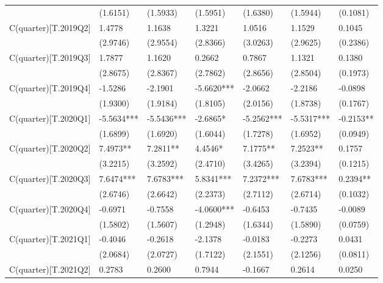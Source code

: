 \begin{table}
\begin{center}
\begin{tabular}{lllllll}
                         & (1.6151)   & (1.5933)   & (1.5951)   & (1.6380)   & (1.5944)   & (0.1081)    \\
C(quarter)[T.2019Q2]     & 1.4778     & 1.1638     & 1.3221     & 1.0516     & 1.1529     & 0.1045      \\
                         & (2.9746)   & (2.9554)   & (2.8366)   & (3.0263)   & (2.9625)   & (0.2386)    \\
C(quarter)[T.2019Q3]     & 1.7877     & 1.1620     & 0.2662     & 0.7867     & 1.1321     & 0.1380      \\
                         & (2.8675)   & (2.8367)   & (2.7862)   & (2.8656)   & (2.8504)   & (0.1973)    \\
C(quarter)[T.2019Q4]     & -1.5286    & -2.1901    & -5.6620*** & -2.0662    & -2.2186    & -0.0898     \\
                         & (1.9300)   & (1.9184)   & (1.8105)   & (2.0156)   & (1.8738)   & (0.1767)    \\
C(quarter)[T.2020Q1]     & -5.5634*** & -5.5436*** & -2.6865*   & -5.2562*** & -5.5317*** & -0.2153**   \\
                         & (1.6899)   & (1.6920)   & (1.6044)   & (1.7278)   & (1.6952)   & (0.0949)    \\
C(quarter)[T.2020Q2]     & 7.4973**   & 7.2811**   & 4.4546*    & 7.1775**   & 7.2523**   & 0.1757      \\
                         & (3.2215)   & (3.2592)   & (2.4710)   & (3.4265)   & (3.2394)   & (0.1215)    \\
C(quarter)[T.2020Q3]     & 7.6474***  & 7.6783***  & 5.8341***  & 7.2372***  & 7.6783***  & 0.2394**    \\
                         & (2.6746)   & (2.6642)   & (2.2373)   & (2.7112)   & (2.6714)   & (0.1032)    \\
C(quarter)[T.2020Q4]     & -0.6971    & -0.7558    & -4.0600*** & -0.6453    & -0.7435    & -0.0089     \\
                         & (1.5802)   & (1.5607)   & (1.2948)   & (1.6344)   & (1.5890)   & (0.0759)    \\
C(quarter)[T.2021Q1]     & -0.4046    & -0.2618    & -2.1378    & -0.0183    & -0.2273    & 0.0431      \\
                         & (2.0684)   & (2.0727)   & (1.7122)   & (2.1551)   & (2.1256)   & (0.0811)    \\
C(quarter)[T.2021Q2]     & 0.2783     & 0.2600     & 0.7944     & -0.1667    & 0.2614     & 0.0250      \\

\end{tabular}
\end{center}
\end{table}
